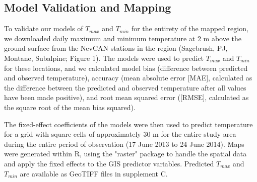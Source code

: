 \documentclass{ametsoc}
\begin{document}
\subsection{Model Validation and Mapping} 
To validate our models of $T_{max}$
and $T_{min}$ for the entirety of the mapped region, we downloaded daily maximum
and minimum temperature at 2 m above the ground surface from the NevCAN stations
in the region (Sagebrush, PJ, Montane, Subalpine; Figure 1). The models were
used to predict $T_{max}$ and $T_{min}$ for these locations, and we calculated
model bias (difference between predicted and observed temperature), 
accuracy (mean absolute error [MAE], calculated as the difference between the
predicted and observed temperature after all values have been made positive),
and root mean squared error ([RMSE], calculated as the square root of the mean bias squared).

The fixed-effect coefficients of the models were then used to predict
temperature for a grid with square cells of approximately 30 m for the entire
study area during the entire period of observation (17 June 2013 to 24 June
2014). Maps were generated within R, using the "raster" \citep{raster2015} package to handle
the spatial data and apply the fixed effects to the GIS predictor variables.
Predicted $T_{max}$ and $T_{min}$ are available as GeoTIFF files in supplement
C.


\end{document}
